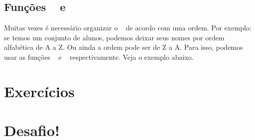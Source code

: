 
\subsection{Funções \funcaosort~ e \funcaorsort}
\label{funcoes-sort-e-rsort}

Muitas vezes é necessário organizar o \tipoarray~ de acordo com uma ordem. Por exemplo:
se temos um conjunto de alunos, podemos deixar seus nomes por ordem alfabética de A a Z.
Ou ainda a ordem pode ser de Z a A. Para isso, podemos usar as funções \funcaosort~ e
\funcaorsort~ respectivamente. Veja o exemplo abaixo.




\section{Exercícios}
\label{cap6-exercicios}

\section{Desafio!}
\label{cap6-desafio}